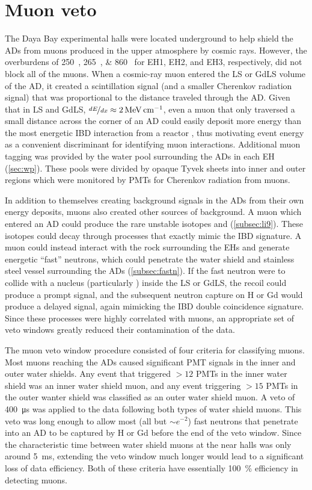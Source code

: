 \section{Muon veto}
\label{sec:muonveto}

The Daya Bay experimental halls were located underground
to help shield the ADs from muons produced in the upper atmosphere by cosmic rays.
However, the overburdens of \SIlist{250;265;860}{\mwe}
for EH1, EH2, and EH3, respectively, did not block all of the muons.
When a cosmic-ray muon entered the LS or GdLS volume of the AD,
it created a scintillation signal (and a smaller Cherenkov radiation signal)
that was proportional to the distance traveled
through the AD.
Given that in LS and GdLS, $\nicefrac{dE}{dx} \approx \SI{2}{\mev\per\cm}$,
even a muon that only traversed a small distance across the corner of an AD could easily deposit
more energy than the most energetic IBD interaction from a reactor \nuebar,
thus motivating event energy as a convenient discriminant for identifying muon interactions.
Additional muon tagging was provided by the water pool
surrounding the ADs in each EH (\cref{sec:wp}).
These pools were divided by opaque Tyvek sheets into inner and outer regions
which were monitored by PMTs for Cherenkov radiation from muons.

In addition to themselves creating background signals in the ADs
from their own energy deposits,
muons also created other sources of background.
A muon which entered an AD could produce
the rare unstable isotopes \li{} and \he{} (\cref{subsec:li9}).
These isotopes could decay through processes that exactly mimic the IBD signature.
A muon could instead interact with the rock surrounding the EHs
and generate energetic ``fast'' neutrons,
which could penetrate the water shield and stainless steel vessel surrounding the ADs
(\cref{subsec:fastn}).
If the fast neutron were to collide with a nucleus (particularly )
inside the LS or GdLS,
the recoil could produce a prompt signal,
and the subsequent neutron capture on H or Gd would produce
a delayed signal, again mimicking the IBD double coincidence signature.
Since these processes were highly correlated with muons,
an appropriate set of veto windows greatly reduced their contamination of the data.

The muon veto window procedure consisted of four criteria
for classifying muons.
Most muons reaching the ADs caused significant PMT signals in the inner and outer water shields.
Any event that triggered $>12$ PMTs in the inner water shield
was an inner water shield muon,
and any event triggering $>15$ PMTs in the outer wanter shield
was classified as an outer water shield muon.
A veto of \SI{400}{\micro\second} was applied to the data following
both types of water shield muons.
This veto was long enough to allow most (all but $\sim e^{-2}$)
fast neutrons that penetrate into an AD to be captured by H or Gd
before the end of the veto window.
Since the characteristic time between water shield muons at the near halls
was only around \SI{5}{\milli\second},
extending the veto window much longer would lead to a significant
loss of data efficiency.
Both of these criteria have essentially \SI{100}{\percent} efficiency
in detecting muons.

